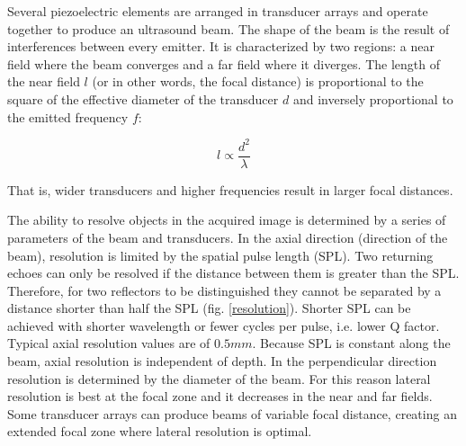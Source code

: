 \documentclass[12pt]{article} %
\begin{document}
	
	Several piezoelectric elements are arranged in transducer arrays and operate together to produce an ultrasound beam. The shape of the beam is the result of interferences between every emitter. It is characterized by two regions: a near field where the beam converges and a far field where it diverges. The length of the near field $l$ (or in other words, the focal distance) is proportional to the square of the effective diameter of the transducer $d$ and inversely proportional to the emitted frequency $f$: 
	
\begin{equation}
l \propto \frac{d^2}{\lambda}
\end{equation}

That is, wider transducers and higher frequencies result in larger focal distances.

	
	The ability to resolve objects in the acquired image is determined by a series of parameters of the beam and transducers. In the axial direction (direction of the beam), resolution is limited by the spatial pulse length (SPL). Two returning echoes can only be resolved if the distance between them is greater than the SPL. Therefore, for two reflectors to be distinguished they cannot be separated by a distance shorter than half the SPL (fig. \ref{resolution}). Shorter SPL can be achieved with shorter wavelength or fewer cycles per pulse, i.e. lower Q factor. Typical axial resolution values are of $0.5 mm$. Because SPL is constant along the beam, axial resolution is independent of depth.
In the perpendicular direction resolution is determined by the diameter of the beam. For this reason lateral resolution is best at the focal zone and it decreases in the near and far fields. Some transducer arrays can produce beams of variable focal distance, creating an extended focal zone where lateral resolution is optimal. 
\end{document}
